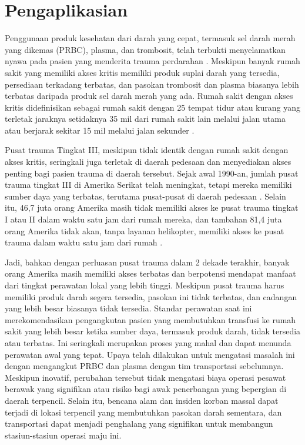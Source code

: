 \section{Pengaplikasian}
\label{sec:pengaplikasian}

Penggunaan produk kesehatan  dari darah yang cepat, termasuk sel darah merah yang dikemas (PRBC), plasma, dan trombosit, telah terbukti menyelamatkan nyawa pada pasien yang menderita trauma perdarahan \citep{berns1998blood} \citep{higgins2012red} \citep{jenkins2014implementation} \citep{riskin2009massive} \citep{mitra2010fresh} \citep{pidcoke2012ten}. Meskipun banyak rumah sakit yang memiliki akses kritis memiliki produk suplai darah yang tersedia, persediaan terkadang terbatas, dan pasokan trombosit dan plasma biasanya lebih terbatas daripada produk sel darah merah yang ada. Rumah sakit dengan akses kritis didefinisikan sebagai rumah sakit dengan 25 tempat tidur atau kurang yang terletak jaraknya setidaknya 35 mil dari rumah sakit lain melalui jalan utama atau berjarak sekitar 15 mil melalui jalan sekunder \citep{reid2014workforce}. 

Pusat trauma Tingkat III, meskipun tidak identik dengan rumah sakit dengan akses kritis, seringkali juga terletak di daerah pedesaan dan menyediakan akses penting bagi pasien trauma di daerah tersebut. Sejak awal 1990-an, jumlah pusat trauma tingkat III di Amerika Serikat telah meningkat, tetapi mereka memiliki sumber daya yang terbatas, terutama pusat-pusat di daerah pedesaan \citep{mackenzie2003national}. Selain itu, 46,7 juta orang Amerika masih tidak memiliki akses ke pusat trauma tingkat I atau II dalam waktu satu jam dari rumah mereka, dan tambahan 81,4 juta orang Amerika tidak akan, tanpa layanan helikopter, memiliki akses ke pusat trauma dalam waktu satu jam dari rumah \citep{branas2005access}. 

Jadi, bahkan dengan perluasan pusat trauma dalam 2 dekade terakhir, banyak orang Amerika masih memiliki akses terbatas dan berpotensi mendapat manfaat dari tingkat perawatan lokal yang lebih tinggi. Meskipun pusat trauma harus memiliki produk darah segera tersedia, pasokan ini tidak terbatas, dan cadangan yang lebih besar biasanya tidak tersedia. Standar perawatan saat ini merekomendasikan pengangkutan pasien yang membutuhkan transfusi ke rumah sakit yang lebih besar ketika sumber daya, termasuk produk darah, tidak tersedia atau terbatas. Ini seringkali merupakan proses yang mahal dan dapat menunda perawatan awal yang tepat. Upaya telah dilakukan untuk mengatasi masalah ini dengan mengangkut PRBC dan plasma dengan tim transportasi sebelumnya. Meskipun inovatif, perubahan tersebut tidak mengatasi biaya operasi pesawat berawak yang signifikan atau risiko bagi awak penerbangan yang bepergian di daerah terpencil. Selain itu, bencana alam dan insiden korban massal dapat terjadi di lokasi terpencil yang membutuhkan pasokan darah sementara, dan transportasi dapat menjadi penghalang yang signifikan untuk membangun stasiun-stasiun operasi maju ini.


